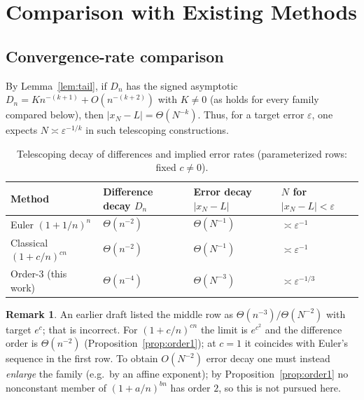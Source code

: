 \documentclass[11pt]{article}
\theoremstyle{definition}
\newtheorem{remark}[theorem]{Remark}
\begin{document}
\section{Comparison with Existing Methods}

\subsection{Convergence-rate comparison}
By Lemma~\ref{lem:tail}, if $D_n$ has the signed asymptotic
$D_n = K n^{-(k+1)} + O(n^{-(k+2)})$ with $K\neq0$ (as holds for every family
compared below), then $|x_N-L|=\Theta(N^{-k})$. Thus, for a target error
$\varepsilon$, one expects $N\asymp\varepsilon^{-1/k}$ in such telescoping
constructions.

\begin{table}[h]\centering
\begin{tabular}{llll}
\toprule
Method & Difference decay $D_n$ & Error decay $|x_N-L|$ & $N$ for $|x_N-L|<\varepsilon$\\
\midrule
Euler $(1+1/n)^n$             & $\Theta(n^{-2})$ & $\Theta(N^{-1})$ & $\asymp\varepsilon^{-1}$\\
Classical $(1+c/n)^{cn}$      & $\Theta(n^{-2})$ & $\Theta(N^{-1})$ & $\asymp\varepsilon^{-1}$\\
Order-3 (this work)           & $\Theta(n^{-4})$ & $\Theta(N^{-3})$ & $\asymp\varepsilon^{-1/3}$\\
\bottomrule
\end{tabular}
\caption{Telescoping decay of differences and implied error rates (parameterized rows: fixed $c\neq0$).}
\label{tab:compare}
\end{table}

\begin{remark}\label{rem:table3}
An earlier draft listed the middle row as $\Theta(n^{-3})/\Theta(N^{-2})$ with
target $e^{c}$; that is incorrect. For $(1+c/n)^{cn}$ the limit is $e^{c^2}$ and
the difference order is $\Theta(n^{-2})$ (Proposition~\ref{prop:order1}); at
$c=1$ it coincides with Euler's sequence in the first row. To obtain
$O(N^{-2})$ error decay one must instead \emph{enlarge} the family (e.g.\ by an
affine exponent); by Proposition~\ref{prop:order1} no nonconstant member of
$(1+a/n)^{bn}$ has order $2$, so this is not pursued here.
\end{remark}
\end{document}
